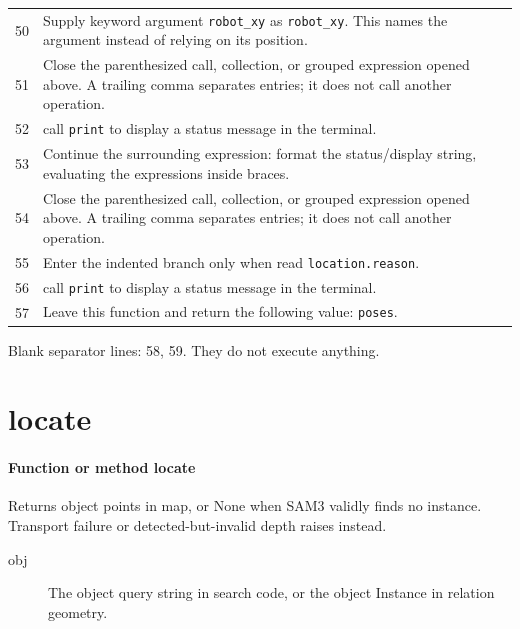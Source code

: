 \documentclass[11pt,a4paper]{book}
\begin{document}
\begin{longtable}{r p{}}
50 & Supply keyword argument \texttt{robot\_xy} as \texttt{robot\_xy}. This names the argument instead of relying on its position. \\

51 & Close the parenthesized call, collection, or grouped expression opened above. A trailing comma separates entries; it does not call another operation. \\

52 & call \texttt{print} to display a status message in the terminal. \\

53 & Continue the surrounding expression: format the status/display string, evaluating the expressions inside braces. \\

54 & Close the parenthesized call, collection, or grouped expression opened above. A trailing comma separates entries; it does not call another operation. \\

55 & Enter the indented branch only when read \texttt{location.reason}. \\

56 & call \texttt{print} to display a status message in the terminal. \\

57 & Leave this function and return the following value: \texttt{poses}. \\

\end{longtable}

Blank separator lines: 58, 59. They do not execute anything.

\section{locate}

\paragraph{Function or method locate}
Returns object points in map, or None when SAM3 validly finds no instance. Transport failure or detected-but-invalid depth raises instead.

\begin{description}
\item[obj] The object query string in search code, or the object Instance in relation geometry.
\end{description}
\end{document}
